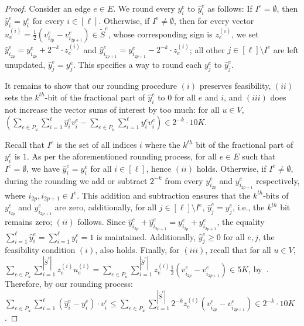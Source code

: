 \begin{proof}
Consider an edge $e \in E$. We round every $y^e_i$ to $\hat{y}^e_i$ as follows: If $I^e = \emptyset$, then $\hat{y}^e_i = y^e_i$ for every $i \in [\ell]$. Otherwise, if $I^e \neq \emptyset$, then for every vector $u^{(i)}_e = \frac{1}{2}( v^e_{i_{2p}} - v^e_{i_{2p+1}} ) \in \widetilde{S}^e$, whose corresponding sign is $z^{(i)}_e$, we set $\hat{y}^e_{i_{2p}} =  y^e_{i_{2p}} + 2^{-k}\cdot z^{(i)}_e$ and $\hat{y}^e_{i_{2p+1}} = y^e_{i_{2p+1}} - 2^{-k}\cdot z^{(i)}_e$; all other $j \in [\ell] \setminus I^e$ are left unupdated, $\hat{y}^e_j = y^e_j$. This specifies a way to round each $y^e_{j}$ to $\hat{y}^e_{j}$.

It remains to show that our rounding procedure $(i)$ preserves feasibility, $(ii)$ sets the $k^{th}$-bit of the fractional part of $\hat{y}^e_i$ to $0$ for all $e$ and $i$, and $(iii)$ does not increase the vector sums of interest by too much: for all $u \in V$, 
$\left( \sum_{e \in P_u} \sum_{i=1}^{\ell} \hat{y}^e_i v^e_i - \sum_{e \in P_u} \sum_{i=1}^{\ell} y^e_i v^e_i  \right) \in 2^{-k} \cdot 10 K$.

Recall that $I^e$ is the set of all indices $i$ where the $k^{th}$ bit of the fractional part of $y^e_{i}$ is $1$. As per the aforementioned rounding process, for all $e \in E$ such that $I^e = \emptyset$, we have $\hat{y}^e_{i} = y^e_{i}$ for all $i \in [\ell]$, hence $(ii)$ holds.
Otherwise, if $I^e \neq \emptyset$, during the rounding we add or subtract $2^{-k}$ from every $y^e_{i_{2p}}$ and $y^e_{i_{2p+1}}$ respectively, where $i_{2p},i_{2p+1} \in I^e$. This addition and subtraction ensures that the $k^{th}$-bits of $y^e_{i_{2p}}$ and $y^e_{i_{2p+1}}$ are zero, additionally, for all $j \in [\ell] \setminus I^e$, $\hat{y}^e_j = y^e_j$, i.e., the $k^{th}$ bit remains zero; $(ii)$ follows. %
Since $\hat{y}^e_{i_{2p}} + \hat{y}^e_{i_{2p+1}} = y^e_{i_{2p}} + y^e_{i_{2p+1}}$, the equality $\sum_{i=1}^{\ell} \hat{y}^e_i = \sum_{i=1}^{\ell} y^e_i = 1$ is maintained. Additionally, $\hat{y}^e_j \geq 0$ for all $e, j$, the feasibility condition $(i)$, also holds.
Finally, for $(iii)$, recall that for all $u \in V$, $\sum_{e \in P_u} \sum_{i=1}^{|\widetilde{S}^e|} z_e^{(i)} u_e^{(i)} = \sum_{e \in P_u} \sum_{i=1}^{|\widetilde{S}^e|} z_e^{(i)} \frac{1}{2} \left(v^e_{i_{2p}} - v^e_{i_{2p+1}}\right) \in 5 K$, by~. Therefore, by our rounding process: $\sum_{e \in P_u} \sum_{i=1}^{\ell} (\hat{y}^e_i -  y^e_i ) \cdot v^e_i \leq \sum_{e \in P_u} \sum_{i=1}^{|\widetilde{S}^e|} 2^{-k} z^{(i)}_e \left(v^e_{i_{2p}} - v^e_{i_{2p+1}}\right) \in 2^{-k} \cdot 10 K$.
\end{proof}








